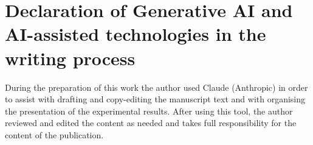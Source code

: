 \documentclass[final,5p,times,twocolumn]{elsarticle}
\begin{document}
\section*{Declaration of Generative AI and AI-assisted technologies in the writing process}

During the preparation of this work the author used Claude (Anthropic) in
order to assist with drafting and copy-editing the manuscript text and with
organising the presentation of the experimental results. After using this
tool, the author reviewed and edited the content as needed and takes full
responsibility for the content of the publication.



\end{document}
